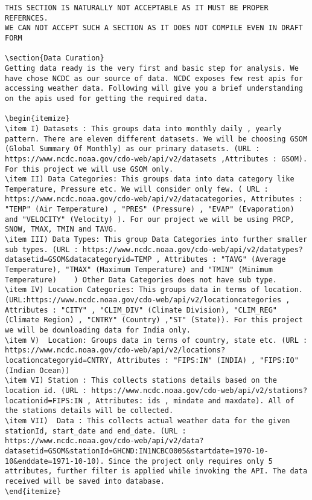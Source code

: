 \documentclass[9pt,twocolumn,twoside]{../../styles/osajnl}
\begin{document}
\begin{verbatim}
THIS SECTION IS NATURALLY NOT ACCEPTABLE AS IT MUST BE PROPER REFERNCES. 
WE CAN NOT ACCEPT SUCH A SECTION AS IT DOES NOT COMPILE EVEN IN DRAFT FORM

\section{Data Curation}
Getting data ready is the very first and basic step for analysis. We have chose NCDC as our source of data. NCDC exposes few rest apis for accessing weather data. Following will give you a brief understanding on the apis used for getting the required data.

\begin{itemize}
\item I) Datasets : This groups data into monthly daily , yearly pattern. There are eleven different datasets. We will be choosing GSOM (Global Summary Of Monthly) as our primary datasets. (URL : https://www.ncdc.noaa.gov/cdo-web/api/v2/datasets ,Attributes : GSOM). For this project we will use GSOM only.	
\item II) Data Categories: This groups data into data category like Temperature, Pressure etc. We will consider only few. ( URL : https://www.ncdc.noaa.gov/cdo-web/api/v2/datacategories, Attributes : "TEMP" (Air Temperature) , "PRES" (Pressure) , "EVAP" (Evaporation) and "VELOCITY" (Velocity) ). For our project we will be using PRCP, SNOW, TMAX, TMIN and TAVG.
\item III) Data Types: This group Data Categories into further smaller sub types. (URL : https://www.ncdc.noaa.gov/cdo-web/api/v2/datatypes?datasetid=GSOM&datacategoryid=TEMP , Attributes : "TAVG" (Average Temperature), "TMAX" (Maximum Temperature) and "TMIN" (Minimum Temperature)    ) Other Data Categories does not have sub type.
\item IV) Location Categories: This groups data in terms of location. (URL:https://www.ncdc.noaa.gov/cdo-web/api/v2/locationcategories , Attributes : "CITY" , "CLIM_DIV" (Climate Division), "CLIM_REG" (Climate Region) , "CNTRY" (Country) ,"ST" (State)). For this project we will be downloading data for India only.
\item V)  Location: Groups data in terms of country, state etc. (URL : https://www.ncdc.noaa.gov/cdo-web/api/v2/locations?locationcategoryid=CNTRY, Attributes : "FIPS:IN" (INDIA) , "FIPS:IO" (Indian Ocean))	
\item VI) Station : This collects stations details based on the location id. (URL : https://www.ncdc.noaa.gov/cdo-web/api/v2/stations?locationid=FIPS:IN , Attributes: ids , mindate and maxdate). All of the stations details will be collected.	
\item VII) 	Data : This collects actual weather data for the given stationId, start_date and end_date. (URL : https://www.ncdc.noaa.gov/cdo-web/api/v2/data?datasetid=GSOM&stationId=GHCND:IN1NCBC0005&startdate=1970-10-10&enddate=1971-10-10). Since the project only requires only 5 attributes, further filter is applied while invoking the API. The data received will be saved into database. 
\end{itemize}


\end{verbatim}
\end{document}
